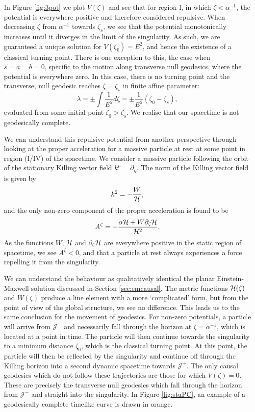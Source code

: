 In Figure \ref{fig:3pot} we plot $V(\zeta)$ and see that for region I, in which $\zeta < \alpha^{-1}$, the potential is everywhere positive and therefore considered repulsive. When decreasing $\zeta$ from $\alpha^{-1}$ towards $\zeta_s$, we see that the potential monotonically increases until it diverges in the limit of the singularity. As such, we are guaranteed a unique solution for $V(\zeta_0) = E^2$, and hence the existence of a classical turning point. There is one exception to this, the case when $s = a = b = 0$, specific to the motion along transverse null geodesics, where the potential is everywhere zero. In this case, there is no turning point and the transverse, null geodesic reaches $\zeta = \zeta_s$ in finite affine parameter:
\begin{equation*}
	\lambda = \pm \int \frac{1}{E^2} d\zeta = \pm \frac{1}{E^2} \left( \zeta_0 - \zeta_s \right),
\end{equation*}
evaluated from some initial point $\zeta_0 > \zeta_s$. We realise that our spacetime is not geodesically complete.
    
We can understand this repulsive potential from another perspective through looking at the proper acceleration for a massive particle at rest at some point in region (I/IV) of the spacetime. We consider a massive particle following the orbit of the stationary Killing vector field $k^\mu = \partial_\eta$. The norm of the Killing vector field is given by
\begin{equation*}
	k^2 = - \frac{W}{{\cal H}},
\end{equation*}
and the only non-zero component  of the proper acceleration  is found to be
\begin{equation}
A^\zeta = - \frac{\alpha {\cal H} + W \partial_\zeta {\cal H}}{{\cal H}^2}.
\end{equation}
As the functions $W$, ${\cal H}$ and $\partial_\zeta {\cal H}$ are everywhere positive in the static region of spacetime, we see $A^\zeta < 0$, and that a particle at rest always experiences a force repelling it from the singularity. 
   
We can understand the behaviour as qualitatively identical the planar Einstein-Maxwell solution discussed in Section \ref{sec:emcausal}. The metric functions ${\cal H}(\zeta)$ and $W(\zeta)$ produce a line element with a more `complicated' form, but from the point of view of the global structure, we see no difference. This leads us to the same conclusion for the movement of geodesics. For non-zero potentials, a particle will arrive from $\mathcal{J}^-$ and necessarily fall through the horizon at $\zeta = \alpha^{-1}$, which is located at a point in time. The particle will then continue towards the singularity to a minimum distance $\zeta_0$, which is the classical turning point. At this point, the particle will then be reflected by the singularity and continue off through the Killing horizon into a second dynamic spacetime towards $\mathcal{J}^+$. The only causal geodesics which do not follow these trajectories are those for which $V(\zeta)=0$. These are precisely the transverse null geodesics which fall through the horizon from $\mathcal{J}^-$ and straight into the singularity. In Figure \ref{fig:stuPC}, an example of a geodesically complete timelike curve is drawn in orange.

